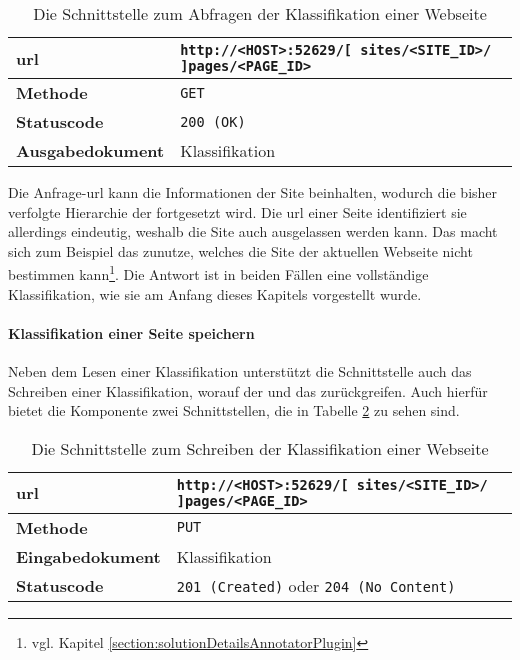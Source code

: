     \begin{table}[htb]
        \centering
        \begin{tabular}{|l|l|}
        \hline
        \textbf{\gls{url}} & \texttt{http://<HOST>:52629/[ sites/<SITE\_ID>/ ]pages/<PAGE\_ID>}\\
        \hline
        \textbf{Methode} & \texttt{GET}\\
        \hline
        \textbf{Statuscode} & \texttt{200 (OK)}\\
        \hline
        \textbf{Ausgabedokument} & Klassifikation\\
        \hline
        \end{tabular}
        \caption{Die Schnittstelle zum Abfragen der Klassifikation einer Webseite}
        \label{table:getFullPageInterface}
    \end{table}

    Die Anfrage-\gls{url} kann die Informationen der Site beinhalten,
    wodurch die bisher verfolgte Hierarchie der {\resources} fortgesetzt wird.
    Die \gls{url} einer Seite identifiziert sie allerdings eindeutig,
    weshalb die Site auch ausgelassen werden kann.
    Das macht sich zum Beispiel das {\annotatorPlugin} zunutze,
    welches die Site der aktuellen Webseite nicht bestimmen
    kann\footnote{vgl. Kapitel \ref{section:solutionDetailsAnnotatorPlugin}}.
    Die Antwort ist in beiden Fällen eine vollständige Klassifikation,
    wie sie am Anfang dieses Kapitels vorgestellt wurde.

    \paragraph{Klassifikation einer Seite speichern}
    Neben dem Lesen einer Klassifikation unterstützt die Schnittstelle auch das Schreiben einer Klassifikation,
    worauf der {\classificationService} und das {\annotatorPlugin} zurückgreifen.
    Auch hierfür bietet die Komponente zwei Schnittstellen, die in Tabelle \ref{table:writePageInterface} zu sehen sind.

    \begin{table}[htb]
        \centering
        \begin{tabular}{|l|l|}
        \hline
        \textbf{\gls{url}} & \texttt{http://<HOST>:52629/[ sites/<SITE\_ID>/ ]pages/<PAGE\_ID>}\\
        \hline
        \textbf{Methode} & \texttt{PUT}\\
        \hline
        \textbf{Eingabedokument} & Klassifikation\\
        \hline
        \textbf{Statuscode} & \texttt{201 (Created)} oder \texttt{204 (No Content)}\\
        \hline
        \end{tabular}
        \caption{Die Schnittstelle zum Schreiben der Klassifikation einer Webseite}
        \label{table:writePageInterface}
    \end{table}

